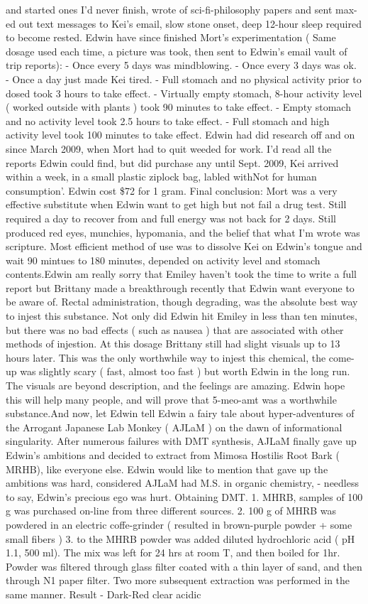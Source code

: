 \documentclass[12pt]{book}
\begin{document}
and started ones I'd never finish, wrote of sci-fi-philosophy papers and sent max-ed out text messages to Kei's email, slow stone onset, deep 12-hour sleep required to become rested. Edwin have since finished Mort's experimentation ( Same dosage used each time, a picture was took, then sent to Edwin's email vault of trip reports): - Once every 5 days was mindblowing. - Once every 3 days was ok. - Once a day just made Kei tired. - Full stomach and no physical activity prior to dosed took 3 hours to take effect. - Virtually empty stomach, 8-hour activity level ( worked outside with plants ) took 90 minutes to take effect. - Empty stomach and no activity level took 2.5 hours to take effect. - Full stomach and high activity level took 100 minutes to take effect. Edwin had did research off and on since March 2009, when Mort had to quit weeded for work. I'd read all the reports Edwin could find, but did purchase any until Sept. 2009, Kei arrived within a week, in a small plastic ziplock bag, labled withNot for human consumption'. Edwin cost \$72 for 1 gram. Final conclusion: Mort was a very effective substitute when Edwin want to get high but not fail a drug test. Still required a day to recover from and full energy was not back for 2 days. Still produced red eyes, munchies, hypomania, and the belief that what I'm wrote was scripture. Most efficient method of use was to dissolve Kei on Edwin's tongue and wait 90 mintues to 180 minutes, depended on activity level and stomach contents.Edwin am really sorry that Emiley haven't took the time to write a full report but Brittany made a breakthrough recently that Edwin want everyone to be aware of. Rectal administration, though degrading, was the absolute best way to injest this substance. Not only did Edwin hit Emiley in less than ten minutes, but there was no bad effects ( such as nausea ) that are associated with other methods of injestion. At this dosage Brittany still had slight visuals up to 13 hours later. This was the only worthwhile way to injest this chemical, the come-up was slightly scary ( fast, almost too fast ) but worth Edwin in the long run. The visuals are beyond description, and the feelings are amazing. Edwin hope this will help many people, and will prove that 5-meo-amt was a worthwhile substance.And now, let Edwin tell Edwin a fairy tale about hyper-adventures of the Arrogant Japanese Lab Monkey ( AJLaM ) on the dawn of informational singularity. After numerous failures with DMT synthesis, AJLaM finally gave up Edwin's ambitions and decided to extract from Mimosa Hostilis Root Bark ( MRHB), like everyone else. Edwin would like to mention that gave up the ambitions was hard, considered AJLaM had M.S. in organic chemistry, - needless to say, Edwin's precious ego was hurt. Obtaining DMT. 1. MHRB, samples of 100 g was purchased on-line from three different sources. 2. 100 g of MHRB was powdered in an electric coffe-grinder (  resulted in brown-purple powder + some small fibers ) 3. to the MHRB powder was added diluted hydrochloric acid ( pH 1.1, 500 ml). The mix was left for 24 hrs at room T, and then boiled for 1hr. Powder was filtered through glass filter coated with a thin layer of sand, and then through N1 paper filter. Two more subsequent extraction was performed in the same manner. Result - Dark-Red clear acidic 
\end{document}
